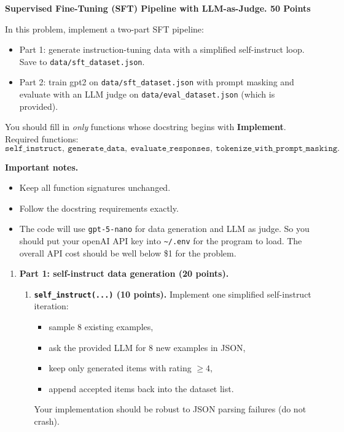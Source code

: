 \begin{Q}
\textbf{Supervised Fine-Tuning (SFT) Pipeline with LLM-as-Judge. 50 Points}

In this problem, implement a two-part SFT pipeline:
\begin{itemize}
\item Part 1: generate instruction-tuning data with a simplified
  self-instruct loop. Save to \texttt{data/sft\_dataset.json}.
\item Part 2: train gpt2 on \texttt{data/sft\_dataset.json} with
  prompt masking and evaluate with an LLM judge on
  \texttt{data/eval\_dataset.json} (which is provided).
\end{itemize}

You should fill in \emph{only} functions whose docstring begins with \textbf{Implement}.  
Required functions:
\[
\texttt{self\_instruct},\ \texttt{generate\_data},\ \texttt{evaluate\_responses},\ \texttt{tokenize\_with\_prompt\_masking}.
\]

\medskip
\noindent\textbf{Important notes.}
\begin{itemize}
\item Keep all function signatures unchanged.
\item Follow the docstring requirements exactly.
\item The code will use \texttt{gpt-5-nano} for data generation and
  LLM as judge. So you should put your openAI API key into
  \verb|~/.env| for
  the program to load. The overall API cost should be well below \$1 for the problem. 
\end{itemize}

\begin{enumerate}

\item \textbf{Part 1: self-instruct data generation (20 points).}

\begin{enumerate}
\item \textbf{\texttt{self\_instruct(...)} (10 points).}
Implement one simplified self-instruct iteration:
\begin{itemize}
\item sample 8 existing examples,
\item ask the provided LLM for 8 new examples in JSON,
\item keep only generated items with rating $\ge 4$,
\item append accepted items back into the dataset list.
\end{itemize}
Your implementation should be robust to JSON parsing failures (do not crash).


\end{enumerate}
\end{enumerate}
\end{Q}
